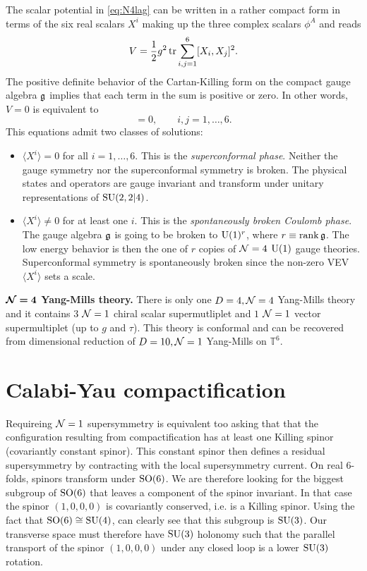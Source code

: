 \documentclass[a4paper,10pt]{article}
\begin{document}
        The scalar potential in \eqref{eq:N4lag} can be written in a rather compact form in terms of the six real scalars $X^i$ making up the three complex scalars $\phi^A$ and reads
        \begin{equation}
            V = \frac{1}{2}g^2\tr\sum^6_{i,j=1}[X_i,X_j]^2.
        \end{equation}
        The positive definite behavior of the Cartan-Killing form on the compact gauge algebra $\mathfrak{g}$ implies that each term in the sum is positive or zero. In other words, $V=0$ is equivalent to
        \begin{equation}
            [X^i,X^j]=0,\qquad i,j=1,\dots,6.
        \end{equation}
        This equations admit two classes of solutions:
        \begin{itemize}
            \item $\langle X^i\rangle=0$ for all $i=1,\dots,6$. This is the \emph{superconformal phase}. Neither the gauge symmetry nor the superconformal symmetry is broken. The physical states and operators are gauge invariant and transform under
            unitary representations of $\text{SU}(2,2|4)$.
            \item  $\langle X^i\rangle\neq0$ for at least one $i$. This is the \emph{spontaneously broken Coulomb phase}. The gauge algebra $\mathfrak{g}$ is going to be broken to $\text{U}(1)^r$, where $r\equiv\rank\mathfrak{g}$. The low energy behavior is then the one of $r$ copies of $\mathcal{N}=4$ $\text{U}(1)$ gauge theories. Superconformal symmetry is spontaneously broken since the non-zero VEV $\langle X^i\rangle$ sets a scale.
        \end{itemize}

        \begin{result}
            \textbf{$\boldsymbol{\mathcal{N}=4}$ Yang-Mills theory.} There is only one $D=4,\mathcal{N}=4$ Yang-Mills theory and it contains $3$ $\mathcal{N}=1$ chiral scalar supermutliplet and $1$ $\mathcal{N}=1$ vector supermultiplet (up to $g$ and $\tau$). This theory is conformal and can be recovered from dimensional reduction of $D=10,\mathcal{N}=1$ Yang-Mills on $\mathbb{T}^6$.
        \end{result}

\section{Calabi-Yau compactification}\label{sec:appCY}

    Requireing $\mathcal{N}=1$ supersymmetry is equivalent too asking that that the configuration resulting from compactification has at least one Killing spinor (covariantly constant spinor). This constant spinor then defines a residual supersymmetry by contracting with the local supersymmetry current. On real $6$-folds, spinors transform under $\text{SO}(6)$. We are therefore looking for the biggest subgroup of $\text{SO}(6)$ that leaves a component of the spinor invariant. In that case the spinor $(1,0,0,0)$ is covariantly conserved, i.e. is a Killing spinor. Using the fact that $\text{SO}(6)\cong\text{SU}(4)$, can clearly see that this subgroup is $\text{SU}(3)$. Our transverse space must therefore have $\text{SU}(3)$ holonomy such that the parallel transport of the spinor $(1,0,0,0)$ under any closed loop is a lower $\text{SU}(3)$ rotation.
\end{document}
